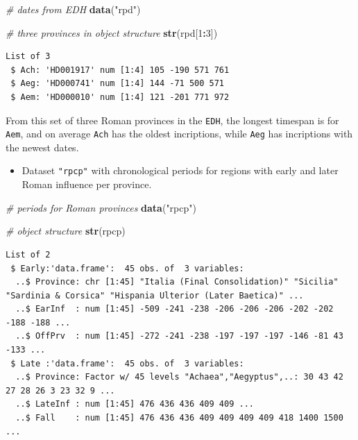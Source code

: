 \documentclass[a4paper,11pt]{memoir}
\newenvironment{Shaded}{\begin{snugshade}}{\end{snugshade}}
\newcommand{\CommentTok}[1]{\textcolor[rgb]{0.56,0.35,0.01}{\textit{#1}}}
\newcommand{\DecValTok}[1]{\textcolor[rgb]{0.00,0.00,0.81}{#1}}
\newcommand{\KeywordTok}[1]{\textcolor[rgb]{0.13,0.29,0.53}{\textbf{#1}}}
\newcommand{\NormalTok}[1]{#1}
\newcommand{\OperatorTok}[1]{\textcolor[rgb]{0.81,0.36,0.00}{\textbf{#1}}}
\newcommand{\StringTok}[1]{\textcolor[rgb]{0.31,0.60,0.02}{#1}}
\providecommand{\tightlist}{%
  \setlength{\itemsep}{0pt}\setlength{\parskip}{0pt}}
\begin{document}
\begin{Shaded}
\begin{Highlighting}[]
\CommentTok{# dates from EDH}
\KeywordTok{data}\NormalTok{(}\StringTok{"rpd"}\NormalTok{)}

\CommentTok{# three provinces in object structure}
\KeywordTok{str}\NormalTok{(rpd[}\DecValTok{1}\OperatorTok{:}\DecValTok{3}\NormalTok{])}
\end{Highlighting}
\end{Shaded}

\begin{verbatim}
List of 3
 $ Ach: 'HD001917' num [1:4] 105 -190 571 761
 $ Aeg: 'HD000741' num [1:4] 144 -71 500 571
 $ Aem: 'HD000010' num [1:4] 121 -201 771 972
\end{verbatim}

From this set of three Roman provinces in the \texttt{EDH}, the longest
timespan is for \texttt{Aem}, and on average \texttt{Ach} has the oldest
incriptions, while \texttt{Aeg} has incriptions with the newest dates.

\begin{itemize}
\tightlist
\item
  Dataset \texttt{"rpcp"} with chronological periods for regions with
  early and later Roman influence per province.
\end{itemize}

\begin{Shaded}
\begin{Highlighting}[]
\CommentTok{# periods for Roman provinces}
\KeywordTok{data}\NormalTok{(}\StringTok{"rpcp"}\NormalTok{)}

\CommentTok{# object structure}
\KeywordTok{str}\NormalTok{(rpcp)}
\end{Highlighting}
\end{Shaded}

\begin{verbatim}
List of 2
 $ Early:'data.frame':  45 obs. of  3 variables:
  ..$ Province: chr [1:45] "Italia (Final Consolidation)" "Sicilia" "Sardinia & Corsica" "Hispania Ulterior (Later Baetica)" ...
  ..$ EarInf  : num [1:45] -509 -241 -238 -206 -206 -206 -202 -202 -188 -188 ...
  ..$ OffPrv  : num [1:45] -272 -241 -238 -197 -197 -197 -146 -81 43 -133 ...
 $ Late :'data.frame':  45 obs. of  3 variables:
  ..$ Province: Factor w/ 45 levels "Achaea","Aegyptus",..: 30 43 42 27 28 26 3 23 32 9 ...
  ..$ LateInf : num [1:45] 476 436 436 409 409 ...
  ..$ Fall    : num [1:45] 476 436 436 409 409 409 409 418 1400 1500 ...
\end{verbatim}
\end{document}
